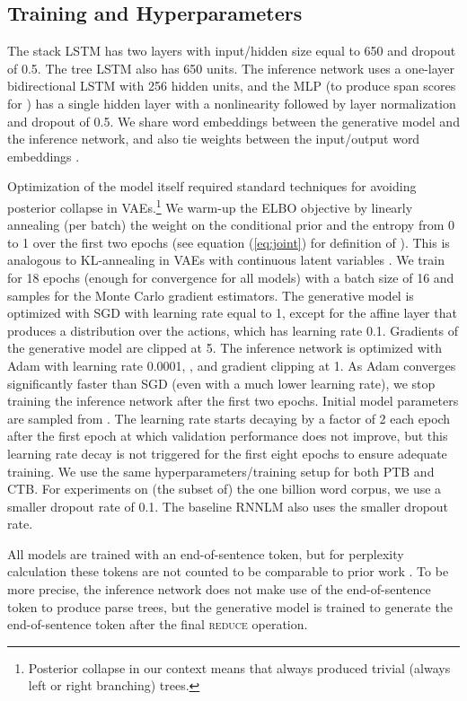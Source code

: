 \documentclass[11pt,a4paper]{article}
\begin{document}
\subsection{Training and Hyperparameters}
\vspace{-1mm}
The stack LSTM has two layers with input/hidden size equal to 650 and dropout of 0.5. The tree LSTM also has 650 units. The inference network uses a one-layer bidirectional LSTM with 256 hidden units, and the MLP (to produce span scores  for ) has a single hidden layer with a  nonlinearity followed by layer normalization \cite{ba2016layernorm} and dropout of 0.5. We share word embeddings between the generative model and the inference network, and also tie weights between the input/output word embeddings \cite{press2016tie}.

Optimization of the model itself required standard techniques for avoiding posterior collapse in VAEs.\footnote{Posterior collapse in our context means that  always produced trivial (always left or right branching) trees.} We warm-up the ELBO objective by linearly annealing (per batch) the weight on the conditional prior  and the entropy  from 0 to 1 over the first two epochs (see equation (\ref{eq:joint}) for definition of ). This is analogous to KL-annealing in
VAEs with continuous latent variables \cite{bowman2016vae,Son2016}.
We train for 18 epochs (enough for convergence for all models) with a batch size of 16 and  samples for the Monte Carlo gradient estimators.
The generative model is optimized with SGD with learning rate equal to 1, except for the affine layer that produces a distribution over the actions, which has learning rate 0.1. Gradients of the generative model are clipped at 5. 
The inference network is optimized with Adam \cite{kingma2015adam} with learning rate 0.0001, , and gradient clipping at 1. As Adam converges significantly faster than SGD (even with a much lower learning rate), we stop training the inference network after the first two epochs. 
Initial model parameters are sampled from .
The learning rate starts decaying by a
factor of 2 each epoch after the first epoch at which validation
performance does not improve, but this learning rate
decay is not triggered for the first eight epochs to ensure adequate training. 
We use the same hyperparameters/training setup for both PTB and CTB. For experiments on (the subset of) the one billion word corpus, we use a smaller dropout rate of 0.1. The baseline RNNLM also uses the smaller dropout rate.

All models are trained with an end-of-sentence token, but for perplexity calculation these tokens  are not counted to be comparable to prior work \cite{dyer2016rnng,kuncoro2017rnng,buys2018syntax}. To be more precise, the inference network does not make use of the end-of-sentence token to produce
parse trees, but the generative model is trained to generate the end-of-sentence token
after the final \textsc{reduce} operation.
\vspace{-2mm}
\end{document}
